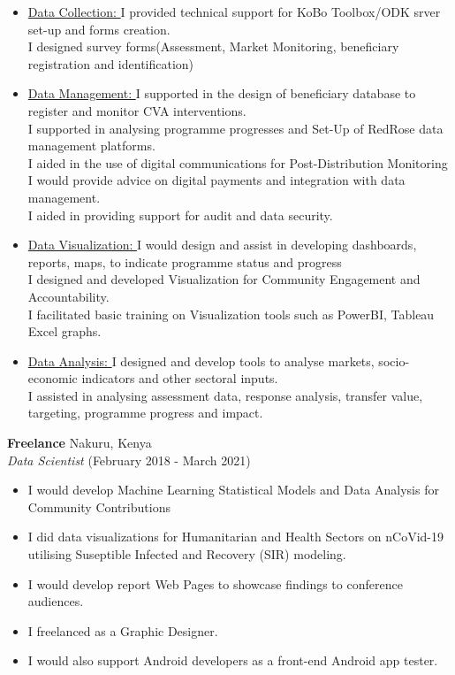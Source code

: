 \documentclass[line,margin,10pt]{res}
\begin{document}
\begin{resume}
\begin{itemize}
    \item \underline{Data Collection: }
    I provided technical support for KoBo Toolbox/ODK srver set-up and forms creation.\\
    I designed survey forms(Assessment, Market Monitoring, beneficiary registration and identification)\\
    \item \underline{Data Management: }
    I supported in the design of beneficiary database to register and monitor CVA interventions.\\
    I supported in analysing programme progresses and Set-Up of RedRose data management platforms.\\
    I aided in the use of digital communications for Post-Distribution Monitoring\\
    I would provide advice on digital payments and integration with data management.\\
    I aided in providing support for audit and data security.\\
    \item \underline{Data Visualization: }
    I would design and assist in developing dashboards, reports, maps, to indicate programme status and progress\\
    I designed and developed Visualization for Community Engagement and Accountability.\\
    I facilitated basic training on Visualization tools such as PowerBI, Tableau Excel graphs.\\
    \item \underline{Data Analysis: }
    I designed and develop tools to analyse markets, socio-economic indicators and other sectoral inputs.\\
    I assisted in analysing assessment data, response analysis, transfer value, targeting, programme progress and impact.\\
\end{itemize}

\textbf{Freelance} \hfill Nakuru, Kenya\\
{\sl Data Scientist} \hfill (February 2018 - March 2021)
\begin{itemize} \itemsep -2pt
    \item I would develop Machine Learning Statistical Models and Data Analysis for Community Contributions
    \item I did data visualizations for Humanitarian and Health Sectors on nCoVid-19 utilising Suseptible Infected and Recovery (SIR) modeling.
    \item I would develop report Web Pages to showcase findings to conference audiences.
    \item I freelanced as a Graphic Designer.
    \item I would also support Android developers as a front-end Android app tester.
\end{itemize}


\end{resume}
\end{document}
